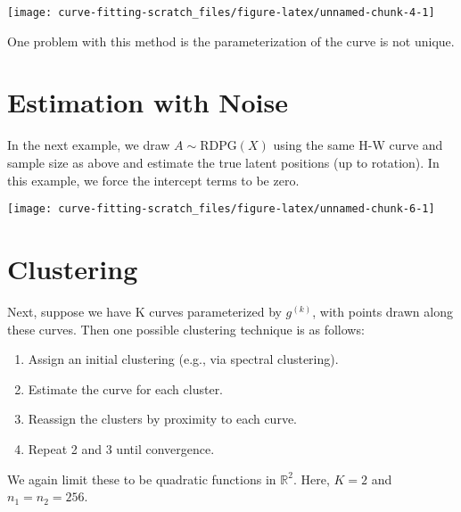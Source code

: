 \documentclass[
  11pt,
]{article}
\providecommand{\tightlist}{%
  \setlength{\itemsep}{0pt}\setlength{\parskip}{0pt}}
\begin{document}
\begin{center}\texttt{[image: curve-fitting-scratch\_files/figure-latex/unnamed-chunk-4-1]} \end{center}

One problem with this method is the parameterization of the curve is not
unique.

\hypertarget{estimation-with-noise}{%
\section{Estimation with Noise}\label{estimation-with-noise}}

\begin{example}

In the next example, we draw $A \sim \mathrm{RDPG}(X)$ using the same H-W curve and sample size as above and estimate the true latent positions (up to rotation). 
In this example, we force the intercept terms to be zero.

\end{example}

\begin{center}\texttt{[image: curve-fitting-scratch\_files/figure-latex/unnamed-chunk-6-1]} \end{center}

\hypertarget{clustering}{%
\section{Clustering}\label{clustering}}

Next, suppose we have K curves parameterized by \(g^{(k)}\), with points
drawn along these curves. Then one possible clustering technique is as
follows:

\begin{enumerate}
\def\labelenumi{\arabic{enumi}.}
\tightlist
\item
  Assign an initial clustering (e.g., via spectral clustering).
\item
  Estimate the curve for each cluster.
\item
  Reassign the clusters by proximity to each curve.
\item
  Repeat 2 and 3 until convergence.
\end{enumerate}

\begin{example}

We again limit these to be quadratic functions in $\mathbb{R}^2$. 
Here, $K = 2$ and $n_1 = n_2 = 256$.

\end{example}
\end{document}
